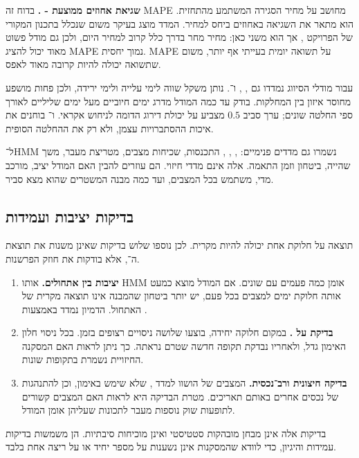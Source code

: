 \textbf{שגיאת אחוזים ממוצעת - .} בדוח זה MAPE מחושב על מחיר הסגירה המשתמע מהתחזית. הוא מתאר את השגיאה באחוזים ביחס למחיר. המדד מוצג בעיקר משום שנכלל בתכנון המקורי של הפרויקט \cite{hyndman2006another}, אך הוא משני כאן: מחיר מחר בדרך כלל קרוב למחיר היום, ולכן גם מודל פשוט מאוד יכול להציג MAPE נמוך יחסית. MAPE על תשואה יומית בעייתי אף יותר, משום שתשואה יכולה להיות קרובה מאוד לאפס.

עבור מודלי הסיווג נמדדו גם , ,  ו־.  נותן משקל שווה לימי עלייה ולימי ירידה, ולכן פחות מושפע מחוסר איזון בין המחלקות.  בודק עד כמה המודל מדרג ימים חיוביים מעל ימים שליליים לאורך ספי החלטה שונים; ערך סביב \(0.5\) מצביע על יכולת דירוג הדומה לניחוש אקראי.  ו־ בוחנים את איכות ההסתברויות עצמן, ולא רק את ההחלטה הסופית.

ל־HMM נשמרו גם מדדים פנימיים: , , , התכנסות, שכיחות מצבים, מטריצת מעבר, משך שהייה, ביטחון  וזמן התאמה. אלה אינם מדדי חיזוי. הם עוזרים להבין האם המודל יציב, מורכב מדי, משתמש בכל המצבים, ועד כמה מבנה המשטרים שהוא מצא סביר.

\subsection{בדיקות יציבות ועמידות}

תוצאה על חלוקת  אחת יכולה להיות מקרית. לכן נוספו שלוש בדיקות שאינן משנות את תוצאת ה־, אלא בודקות את חוזק הפרשנות.

\begin{enumerate}
    \item \textbf{יציבות בין אתחולים.} אותו HMM אומן כמה פעמים עם  שונים. אם המודל מוצא כמעט אותה חלוקת ימים למצבים בכל פעם, יש יותר ביטחון שהמבנה אינו תוצאה מקרית של האתחול. הדמיון נמדד באמצעות .

    \item \textbf{בדיקת  על .} במקום חלוקה יחידה, בוצעו שלושה ניסויים רצופים בזמן. בכל ניסוי חלון האימון גדל, ולאחריו נבדקת תקופה חדשה שטרם נראתה. כך ניתן לראות האם המסקנה החיזויית נשמרת בתקופות שונות.

    \item \textbf{בדיקה חיצונית ורב־נכסית.} המצבים של  הושוו למדד , שלא שימש באימון, וכן להתנהגות של נכסים אחרים באותם תאריכים. מטרת הבדיקה היא לראות האם המצבים קשורים לתופעות שוק נוספות מעבר לתכונות שעליהן אומן המודל.
\end{enumerate}

בדיקות אלה אינן מבחן מובהקות סטטיסטי ואינן מוכיחות סיבתיות. הן משמשות בדיקות עמידות והיגיון, כדי לוודא שהמסקנות אינן נשענות על מספר יחיד או על ריצה אחת בלבד.
